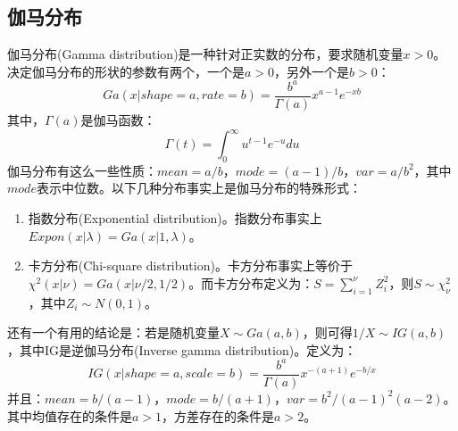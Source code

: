 \documentclass[UTF8, 12pt]{ctexart}
\begin{document}
\subsection{伽马分布}
	伽马分布(Gamma distribution)是一种针对正实数的分布，要求随机变量$x > 0$。决定伽马分布的形状的参数有两个，一个是$a > 0$，另外一个是$b > 0$：
	\begin{equation}
		Ga(x|shape=a, rate=b) = \frac{b^{a}}{\Gamma(a)}x^{a-1}e^{-xb}
	\end{equation}
	其中，$\Gamma(a)$是伽马函数：
	\begin{equation}
		\Gamma(t) = \int_{0}^{\infty} {u^{t-1}e^{-u}}du
	\end{equation}
	伽马分布有这么一些性质：$mean=a/b$，$mode=(a-1)/b$，$var=a/b^{2}$，其中$mode$表示中位数。以下几种分布事实上是伽马分布的特殊形式：
	\begin{enumerate}
		\item 指数分布(Exponential distribution)。指数分布事实上$Expon(x|\lambda) = Ga(x|1, \lambda)$。
		\item 卡方分布(Chi-square distribution)。卡方分布事实上等价于$\chi^{2}(x|\nu) = Ga(x|\nu/2, 1/2)$。而卡方分布定义为：$S=\sum_{i=1}^{\nu}{Z_{i}^{2}}$，则$S \sim \chi_{\nu}^{2}$，其中$Z_{i} \sim N(0, 1)$。
	\end{enumerate}
	还有一个有用的结论是：若是随机变量$X \sim Ga(a, b)$，则可得$1/X \sim IG(a, b)$，其中IG是逆伽马分布(Inverse gamma distribution)。定义为：
	\begin{equation}
		IG(x| shape=a, scale=b) = \frac{b^{a}}{\Gamma(a)}x^{-(a+1)}e^{-b/x}
	\end{equation}
	并且：$mean=b/(a-1)$，$mode=b/(a+1)$，$var=b^{2}/(a-1)^{2}(a-2)$。其中均值存在的条件是$a > 1$，方差存在的条件是$a > 2$。
	
\end{document}
